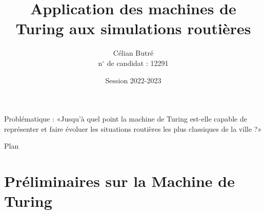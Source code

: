 \documentclass[12pt]{beamer}
\title{Application des machines de Turing aux simulations routières}
\author{Célian Butré \\ n$^{\circ} $ de candidat : 12291}
\date{Session 2022-2023}
\begin{document}
\begin{frame}
  \titlepage
  \begin{center}
      Problématique : «Jusqu'à quel point la machine de Turing est-elle capable de représenter et faire évoluer les
situations routières les plus classiques de la ville ?»
  \end{center}
\end{frame}

\begin{frame}{Plan}
\vspace{0.125cm}
    \begin{minipage}{\textwidth}
        \begin{minipage}{\textwidth}
        \end{minipage}
    \end{minipage}
\end{frame}

\section{Préliminaires sur la Machine de Turing}
\end{document}
